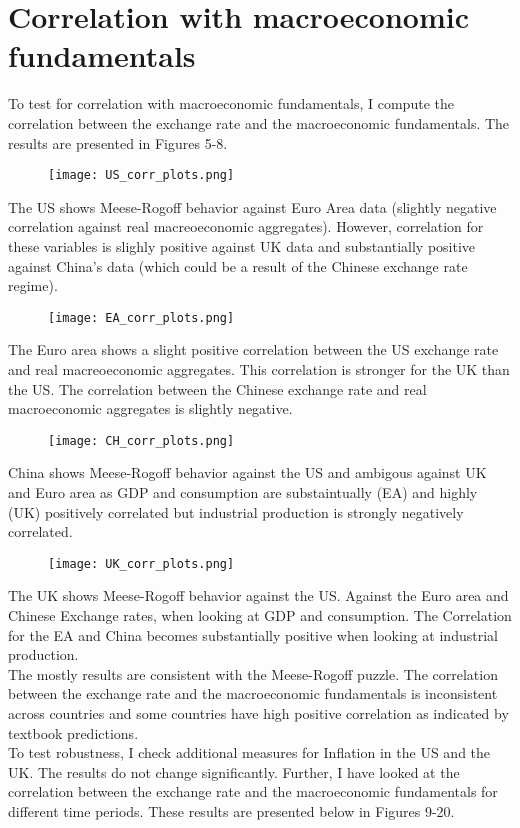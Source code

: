 \documentclass{article}
\begin{document}
\section{Correlation with macroeconomic fundamentals}

To test for correlation with macroeconomic fundamentals, I compute the correlation between the exchange rate and the macroeconomic fundamentals. 
The results are presented in Figures 5-8.

\begin{figure}[H]
    \centering
    \texttt{[image: US\_corr\_plots.png]}
\end{figure}
The US shows Meese-Rogoff behavior against Euro Area data (slightly negative correlation against real macreoeconomic aggregates). However, correlation for these variables is slighly positive against UK data and substantially positive against China's data (which could be a result of the Chinese exchange rate regime).

\begin{figure}[H]
    \centering
    \texttt{[image: EA\_corr\_plots.png]}
\end{figure}
The Euro area shows a slight positive correlation between the US exchange rate and real macreoeconomic aggregates. This correlation is stronger for the UK than the US. The correlation between the Chinese exchange rate and real macroeconomic aggregates is slightly negative.

\begin{figure}[H]
    \centering
    \texttt{[image: CH\_corr\_plots.png]}
\end{figure}
China shows Meese-Rogoff behavior against the US and ambigous against UK and Euro area as GDP and consumption are substaintually (EA) and highly (UK) positively correlated but industrial production is strongly negatively correlated.

\begin{figure}[H]
    \centering
    \texttt{[image: UK\_corr\_plots.png]}
\end{figure}
The UK shows Meese-Rogoff behavior against the US. Against the Euro area and Chinese Exchange rates, when looking at GDP and consumption. The Correlation for the EA and China becomes substantially positive when looking at industrial production.\\

The mostly results are consistent with the Meese-Rogoff puzzle. The correlation between the exchange rate and the macroeconomic fundamentals is inconsistent across countries and some countries have high positive correlation as indicated by textbook predictions.\\
To test robustness, I check additional measures for Inflation in the US and the UK. The results do not change significantly. Further, I have looked at the correlation between the exchange rate and the macroeconomic fundamentals for different time periods. These results are presented below in Figures 9-20.
\end{document}
